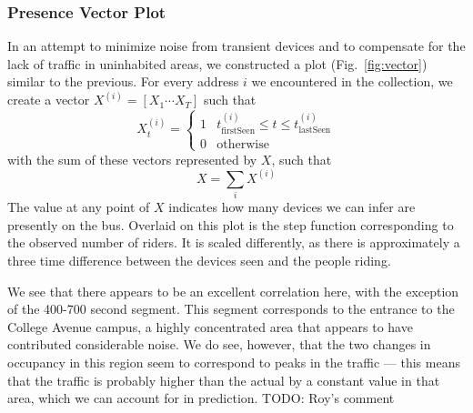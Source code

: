 \subsubsection*{Presence Vector Plot}

In an attempt to minimize noise from transient devices and to compensate for the lack of traffic in uninhabited areas, we constructed a plot (Fig.~\ref{fig:vector}) similar to the previous.
For every address $i$ we encountered in the collection, we create a vector \(X^{(i)}= [ X_1 \cdots X_T ] \) such that
\begin{equation*}
  X_t^{(i)} = \begin{cases}
    1 & t_{\text{firstSeen}}^{(i)} \le t \le t_{\text{lastSeen}}^{(i)}\\
    0 & \text{otherwise}
  \end{cases}
\end{equation*}
with the sum of these vectors represented by $X$, such that \[X = \sum\limits_i X^{(i)}\]
The value at any point of $X$ indicates how many devices we can infer are presently on the bus.
Overlaid on this plot is the step function corresponding to the observed number of riders.
It is scaled differently, as there is approximately a three time difference between the devices seen and the people riding.

We see that there appears to be an excellent correlation here, with the exception of the 400-700 second segment. %
This segment corresponds to the entrance to the College Avenue campus, a highly concentrated area that appears to have contributed considerable noise.
We do see, however, that the two changes in occupancy in this region seem to correspond to peaks in the traffic --- this means that the traffic is probably higher than the actual by a constant value in that area, which we can account for in prediction. TODO: Roy's comment
